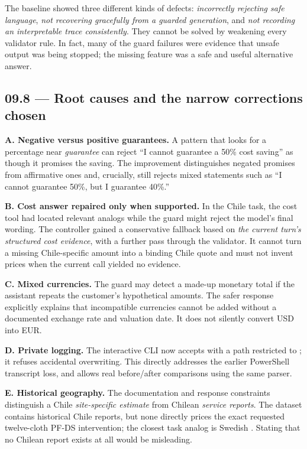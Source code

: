 \documentclass[11pt,a4paper]{article}
\DeclareRobustCommand{\code}[1]{{\ttfamily\small\detokenize{#1}}}
\begin{document}
The baseline showed three different kinds of defects: \emph{incorrectly rejecting safe language}, \emph{not recovering gracefully from a guarded generation}, and \emph{not recording an interpretable trace consistently}. They cannot be solved by weakening every validator rule. In fact, many of the guard failures were evidence that unsafe output was being stopped; the missing feature was a safe and useful alternative answer.

\subsection{09.8 --- Root causes and the narrow corrections chosen}
\textbf{A. Negative versus positive guarantees.} A pattern that looks for a percentage near \emph{guarantee} can reject ``I cannot guarantee a 50\% cost saving'' as though it promises the saving. The improvement distinguishes negated promises from affirmative ones and, crucially, still rejects mixed statements such as ``I cannot guarantee 50\%, but I guarantee 40\%.''

\textbf{B. Cost answer repaired only when supported.} In the Chile task, the cost tool had located relevant analogs while the guard might reject the model's final wording. The controller gained a conservative fallback based on \emph{the current turn's structured cost evidence}, with a further pass through the validator. It cannot turn a missing Chile-specific amount into a binding Chile quote and must not invent prices when the current call yielded no evidence.

\textbf{C. Mixed currencies.} The guard may detect a made-up monetary total if the assistant repeats the customer's hypothetical amounts. The safer response explicitly explains that incompatible currencies cannot be added without a documented exchange rate and valuation date. It does not silently convert USD into EUR.

\textbf{D. Private logging.} The interactive CLI now accepts \code{--session-log} with a path restricted to ; it refuses accidental overwriting. This directly addresses the earlier PowerShell transcript loss, and allows real before/after comparisons using the same parser.

\textbf{E. Historical geography.} The documentation and response constraints distinguish a Chile \emph{site-specific estimate} from Chilean \emph{service reports}. The dataset contains historical Chile reports, but none directly prices the exact requested twelve-cloth PF-DS intervention; the closest task analog is Swedish \code{FSR-0027}. Stating that no Chilean report exists at all would be misleading.
\end{document}
